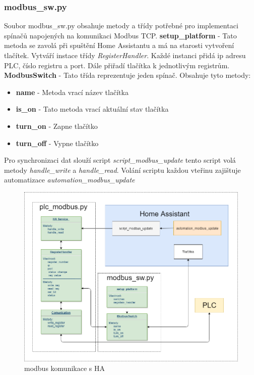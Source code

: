 \documentclass[a4paper,12pt,czech,bibliography=totoc]{scrbook}
\begin{document}
\subsubsection{modbus\_sw.py}
Soubor modbus\_sw.py obsahuje metody a třídy potřebné pro implementaci spínačů napojených na komunikaci Modbus TCP.
\newline
\textbf{setup\_platform} - Tato metoda se zavolá při spuštění Home Assistantu a má na starosti vytvoření tlačítek. Vytváří instace třídy \textit{RegisterHandler}. Každé instanci přidá ip adresu PLC, číslo registru a port. Dále přiřadí tlačítka k jednotlivým registrům.
\newline
\textbf{ModbusSwitch} - Tato třída reprezentuje jeden spínač. Obsahuje tyto metody:
\begin{itemize}
	\item \textbf{name} - Metoda vrací název tlačítka
	\item \textbf{is\_on} - Tato metoda vrací aktuální stav tlačítka
	\item \textbf{turn\_on} - Zapne tlačítko
	\item \textbf{turn\_off} - Vypne tlačítko
\end{itemize}

Pro synchronizaci dat slouží script \textit{script\_modbus\_update} tento script volá metody \textit{handle\_write} a \textit{handle\_read}. Volání scriptu každou vteřinu zajištuje automatizace \textit{automation\_modbus\_update}  


\begin{figure}[h]
	\centering
	\includegraphics[scale = 0.5]{modbusDiagram.PNG}
	\caption{modbus komunikace s HA}
	\label{fig:my_label}
\end{figure}
\end{document}
